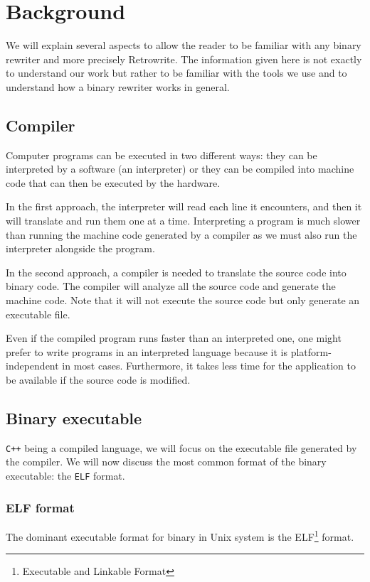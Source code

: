 \documentclass[a4paper,11pt,oneside]{report}
\newcommand{\sysname}{Retrowrite\xspace}
\begin{document}
\chapter{Background}
We will explain several aspects to allow the reader to be familiar
with any binary rewriter and more precisely \sysname. The information given
here is not exactly to understand our work but rather to be familiar with the
tools we use and to understand how a binary rewriter works in general.


\section{Compiler}
Computer programs can be executed in two different ways: they can be interpreted
by a software (an interpreter) or they can be compiled into machine code that can
then be executed by the hardware. 


In the first approach, the interpreter will read each line it encounters, and
then it will translate and run them one at a time. Interpreting a program
is much slower than running the machine code generated by a compiler as we must
also run the interpreter alongside the program.

In the second approach, a compiler is needed to translate the source code into
binary code. The compiler will analyze all the source code and generate the
machine code. Note that it will not execute the source code but only generate
an executable file.


Even if the compiled program runs faster than an interpreted one, one might
prefer to write programs in an interpreted language because it is
platform-independent in most cases. Furthermore,  it takes less time for the
application to be available if the source code is modified.

\section{Binary executable}
\texttt{C++} being a compiled language, we will focus on the executable file
generated by the compiler. We will now discuss the most common format of the binary
executable: the \texttt{ELF} format.

\subsection{ELF format}
%
The dominant executable format for binary in Unix system is the
ELF\footnote{Executable and Linkable Format} format. 
\end{document}
